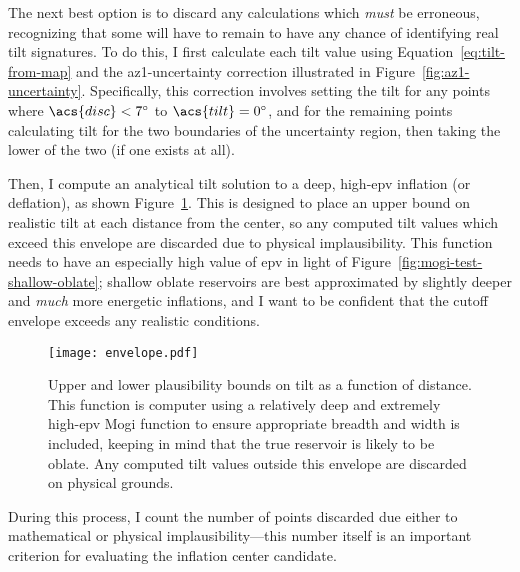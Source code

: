 The next best option is to discard any calculations which \emph{must} be erroneous, recognizing that some will have to remain to have any chance of identifying real tilt signatures. To do this, I first calculate each tilt value using Equation~\eqref{eq:tilt-from-map} and the \acs{az1}-uncertainty correction illustrated in Figure~\ref{fig:az1-uncertainty}. Specifically, this correction involves setting the tilt for any points where $\acs{disc}<\ang{7}$ to $\acs{tilt}=\ang{0}$, and for the remaining points calculating \acs{tilt} for the two boundaries of the uncertainty region, then taking the lower of the two (if one exists at all).

Then, I compute an analytical tilt solution to a deep, high-\acs{epv} inflation (or deflation), as shown Figure~\ref{fig:envelope}. This is designed to place an upper bound on realistic tilt at each distance from the center, so any computed tilt values which exceed this envelope are discarded due to physical implausibility. This function needs to have an especially high value of \acs{epv} in light of Figure~\ref{fig:mogi-test-shallow-oblate}; shallow oblate reservoirs are best approximated by slightly deeper and \emph{much} more energetic inflations, and I want to be confident that the cutoff envelope exceeds any realistic conditions.

\begin{figure}
    \texttt{[image: envelope.pdf]}%
    \caption[Tilt Plausibility Envelope]{Upper and lower plausibility bounds on tilt as a function of distance. This function is computer using a relatively deep and extremely high-\acs{epv} Mogi function to ensure appropriate breadth and width is included, keeping in mind that the true reservoir is likely to be oblate. Any computed tilt values outside this envelope are discarded on physical grounds.}%
    \label{fig:envelope}
\end{figure}

During this process, I count the number of points discarded due either to mathematical or physical implausibility---this number itself is an important criterion for evaluating the inflation center candidate.

